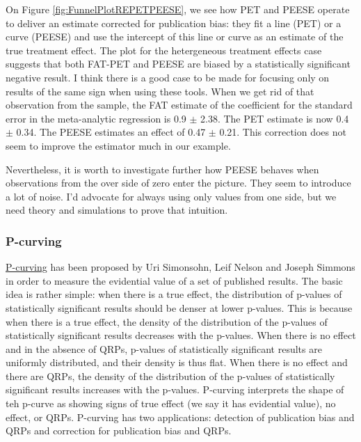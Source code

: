 \documentclass[
]{book}
\theoremstyle{definition}
\theoremstyle{definition}
\theoremstyle{definition}
\theoremstyle{definition}
\theoremstyle{remark}
\begin{document}
On Figure \ref{fig:FunnelPlotREPETPEESE}, we see how PET and PEESE operate to deliver an estimate corrected for publication bias: they fit a line (PET) or a curve (PEESE) and use the intercept of this line or curve as an estimate of the true treatment effect.
The plot for the hetergeneous treatment effects case suggests that both FAT-PET and PEESE are biased by a statistically significant negative result.
I think there is a good case to be made for focusing only on results of the same sign when using these tools.
When we get rid of that observation from the sample, the FAT estimate of the coefficient for the standard error in the meta-analytic regression is 0.9 \(\pm\) 2.38.
The PET estimate is now 0.4 \(\pm\) 0.34.
The PEESE estimates an effect of 0.47 \(\pm\) 0.21.
This correction does not seem to improve the estimator much in our example.

Nevertheless, it is worth to investigate further how PEESE behaves when observations from the over side of zero enter the picture.
They seem to introduce a lot of noise.
I'd advocate for always using only values from one side, but we need theory and simulations to prove that intuition.

\hypertarget{p-curving}{%
\subsubsection{P-curving}\label{p-curving}}

\href{http://www.p-curve.com}{P-curving} has been proposed by Uri Simonsohn, Leif Nelson and Joseph Simmons in order to measure the evidential value of a set of published results.
The basic idea is rather simple: when there is a true effect, the distribution of p-values of statistically significant results should be denser at lower p-values.
This is because when there is a true effect, the density of the distribution of the p-values of statistically significant results decreases with the p-values.
When there is no effect and in the absence of QRPs, p-values of statistically significant results are uniformly distributed, and their density is thus flat.
When there is no effect and there are QRPs, the density of the distribution of the p-values of statistically significant results increases with the p-values.
P-curving interprets the shape of teh p-curve as showing signs of true effect (we say it has evidential value), no effect, or QRPs.
P-curving has two applications: detection of publication bias and QRPs and correction for publication bias and QRPs.
\end{document}
